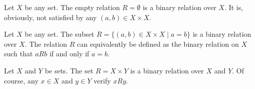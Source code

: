 \begin{example}
\begin{parlist}
\item Let $X$ be any set.
The empty relation $R = \emptyset$ is a binary relation over $X$.
It is, obviously, not satisfied by any $(a,b)\in X\times X$.
\item Let $X$ be any set.
The subset $R = \{(a,b)\in X\times X \mid a = b\}$ is a binary relation over $X$.
The relation $R$ can equivalently be defined as the binary relation on $X$ such that $aRb$ if and only if $a= b$.
\item Let $X$ and $Y$ be sets.
The set $R = X\times Y$ is a binary relation over $X$ and $Y$.
Of course, any $x\in X$ and $y\in Y$ verify $xRy$.
\end{parlist}
\end{example}

